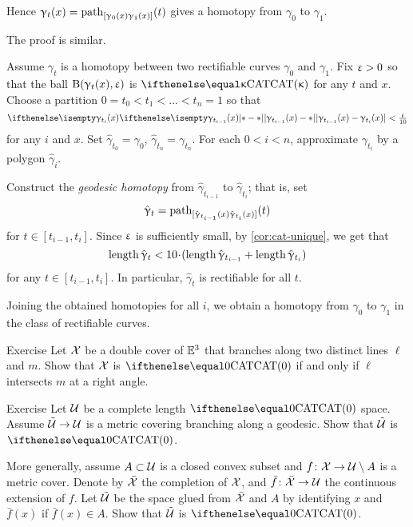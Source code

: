 Hence $\upgamma_t(x)=\mathrm{path}_{[\upgamma_0(x)\upgamma_1(x)]}(t)$ gives a homotopy from $\gamma_0$ to $\gamma_1$.

 The proof is similar.

Assume $\gamma_t$ is a homotopy between two rectifiable curves $\gamma_0$ and $\gamma_1$.
Fix $\upvarepsilon>0$ so that the ball $\mathrm{B}{}(\upgamma_t(x),\upvarepsilon)$ is $\CAT\kappa$
for any $t$ and $x$.
Choose a partition $0=t_0<t_1<\dots<t_n=1$ 
so that 
$$\dist{\gamma_{t_{i-1}}(x)}{\gamma_{t_i}(x)}{}<\tfrac\eps{10}$$
for any $i$ and $x$.
Set $\hat\gamma_{t_0}=\gamma_0$, $\hat\gamma_{t_n}=\gamma_{t_n}$.
For each $0<i<n$, approximate $\gamma_{t_i}$ by a polygon $\hat\gamma_{i}$.

Construct the \emph{geodesic homotopy} 
from $\hat\gamma_{t_{i-1}}$ 
to $\hat\gamma_{t_i}$;  
that is,
set 
$$\hat{\upgamma}_t
=
\mathrm{path}_{[\hat{\upgamma}_{t_{i-1}}(x)\hat{\upgamma}_{t_i}(x)]}(t)$$
for $t\in [t_{i-1},t_i]$.
Since $\upvarepsilon$ is sufficiently small, 
by \ref{cor:cat-unique}, we get that
$$\length\hat\gamma_t
<
10\cdot(\length\hat\gamma_{t_{i-1}}+\length\hat\gamma_{t_i})$$
for any $t\in [t_{i-1},t_i]$.
In particular, $\hat\gamma_t$ is rectifiable for all $t$.

Joining the obtained homotopies for all $i$, we obtain a homotopy from $\gamma_0$ to $\gamma_1$ in the class of rectifiable curves.
\qeds

\begin{thm}{Exercise}\label{ex:cover-branching-along-2-lines}
Let $\mathcal{X}$ be a double cover of $\mathbb{E}^3$ that branches along two distinct lines $\ell$ and $m$.
Show that  $\mathcal{X}$ is $\CAT0$ if and only if $\ell$ intersects $m$ at a right angle.
\end{thm}

\begin{thm}{Exercise}\label{ex:branching}
Let $\mathcal{U}$ be a complete length $\CAT0$ space.
Assume $\tilde{\spc{U}}\to \spc{U}$ is a metric covering branching along a geodesic.
Show that $\tilde{\mathcal{U}}$ is $\CAT0$.

More generally, assume $A\subset \spc{U}$ is a closed convex subset and $f\:\spc{X}\to \spc{U}\setminus A$ is a metric cover.
Denote by $\bar{\mathcal{X}}$ the completion of $\mathcal{X}$, and 
$\bar f\:\bar{\spc{X}}\to \spc{U}$ the continuous extension of $f$.
Let $\tilde{\mathcal{U}}$ be the space glued from $\bar{\mathcal{X}}$ and $A$ by identifying $x$ and $\bar f(x)$ if $\bar f(x)\in A$.
Show that $\tilde{\mathcal{U}}$ is $\CAT0$.
\end{thm}

